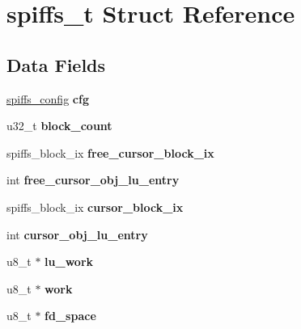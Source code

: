 \hypertarget{structspiffs__t}{}\section{spiffs\+\_\+t Struct Reference}
\label{structspiffs__t}
\subsection*{Data Fields}
\begin{DoxyCompactItemize}
\item 
\mbox{\label{structspiffs__t_a7f9247b4b84e6b6a6f3b988fdf83ba99}} 
\mbox{\hyperlink{structspiffs__config}{spiffs\+\_\+config}} {\bfseries cfg}
\item 
\mbox{\label{structspiffs__t_a8554c5fc24edbd495ed55da15ea172af}} 
u32\+\_\+t {\bfseries block\+\_\+count}
\item 
\mbox{\label{structspiffs__t_a0e0cb263ec86272f5a75503d362582c7}} 
spiffs\+\_\+block\+\_\+ix {\bfseries free\+\_\+cursor\+\_\+block\+\_\+ix}
\item 
\mbox{\label{structspiffs__t_aa98ef3edf530c19d0847f900720f3499}} 
int {\bfseries free\+\_\+cursor\+\_\+obj\+\_\+lu\+\_\+entry}
\item 
\mbox{\label{structspiffs__t_ab61206cd5cbcaf8ee4bcd1cdf2fb53ad}} 
spiffs\+\_\+block\+\_\+ix {\bfseries cursor\+\_\+block\+\_\+ix}
\item 
\mbox{\label{structspiffs__t_aaac9760dde13fbb11ba81871ecee6b7c}} 
int {\bfseries cursor\+\_\+obj\+\_\+lu\+\_\+entry}
\item 
\mbox{\label{structspiffs__t_aadc62737ea37cf850aa84f7cb0faabb2}} 
u8\+\_\+t $\ast$ {\bfseries lu\+\_\+work}
\item 
\mbox{\label{structspiffs__t_af48f680e30ac20c12412545af0515201}} 
u8\+\_\+t $\ast$ {\bfseries work}
\item 
\mbox{\label{structspiffs__t_a4471d7ec110042b1c68cb06311b1daf9}} 
u8\+\_\+t $\ast$ {\bfseries fd\+\_\+space}

\end{DoxyCompactItemize}
